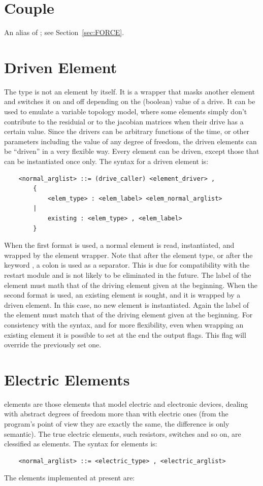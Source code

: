 \section{Couple}
An alias of ; see Section~\ref{sec:FORCE}.


\section{Driven Element}
The  type is not an element by itself. It is a wrapper that
masks another element and switches it on and off depending on the (boolean)
value of a drive. It can be used to emulate a variable topology model, where 
some elements simply don't contribute to the residuial or to the jacobian
matrices when their drive has a certain value. Since the drivers can be
arbitrary functions of the time, or other parameters including the value of
any degree of freedom, the driven elements can be ``driven'' in a very
flexible way. Every element can be driven, except those that can be
instantiated once only.
The syntax for a driven element is:
\begin{verbatim}
    <normal_arglist> ::= (drive_caller) <element_driver> ,
        {
            <elem_type> : <elem_label> <elem_normal_arglist> 
        |   
            existing : <elem_type> , <elem_label>
        }
\end{verbatim}
When the first format is used, a normal element is read, instantiated, and
wrapped by the  element wrapper. Note that after the element type,
or after the keyword , a colon is used as a separator.
This is due for compatibility with the restart module and is not likely 
to be eliminated in the future. 
The label of the element must math that of the driving element given at
the beginning.
When the second format is used, an existing element is sought, and it is
wrapped by a driven element. In this case, no new element is instantiated.
Again the label of the element must match that of the driving element given 
at the beginning. For consistency with the syntax, and for more flexibility,
even when wrapping an existing element it is possible to set at the end the
output flags. This flag will override the previously set one.





\section{Electric Elements}
 elements are those elements that model electric and electronic
devices, dealing with abstract degrees of freedom more than with electric
ones (from the program's point of view they are exactly the same, the
difference is only semantic). The true electric elements, such resistors,
switches and so on, are clessified as  elements.
The syntax for  elements is:
\begin{verbatim}
    <normal_arglist> ::= <electric_type> , <electric_arglist>
\end{verbatim}
The  elements implemented at present are:

